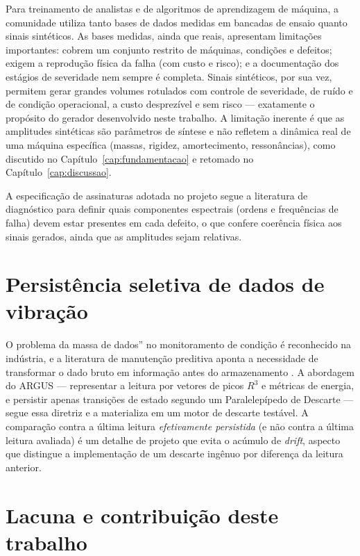 Para treinamento de analistas e de algoritmos de aprendizagem de máquina, a
comunidade utiliza tanto bases de dados medidas em bancadas de ensaio quanto
sinais sintéticos. As bases medidas, ainda que reais, apresentam limitações
importantes: cobrem um conjunto restrito de máquinas, condições e defeitos;
exigem a reprodução física da falha (com custo e risco); e a documentação dos
estágios de severidade nem sempre é completa. Sinais sintéticos, por sua vez,
permitem gerar grandes volumes rotulados com controle de severidade, de ruído e
de condição operacional, a custo desprezível e sem risco --- exatamente o
propósito do gerador desenvolvido neste trabalho. A limitação inerente é que as
amplitudes sintéticas são parâmetros de síntese e não refletem a dinâmica real
de uma máquina específica (massas, rigidez, amortecimento, ressonâncias), como
discutido no Capítulo~\ref{cap:fundamentacao} e retomado no
Capítulo~\ref{cap:discussao}.

A especificação de assinaturas adotada no projeto segue a literatura de
diagnóstico para definir quais componentes espectrais (ordens e frequências de
falha) devem estar presentes em cada defeito, o que confere coerência física aos
sinais gerados, ainda que as amplitudes sejam relativas.

\section{Persistência seletiva de dados de vibração}

O problema da \texttt{}massa de dados'' no monitoramento de condição é reconhecido na
indústria, e a literatura de manutenção preditiva aponta a necessidade de
transformar o dado bruto em informação antes do armazenamento
\cite{scheffer2004}. A abordagem do ARGUS --- representar a leitura por vetores
de picos \(R^3\) e métricas de energia, e persistir apenas transições de estado
segundo um Paralelepípedo de Descarte --- segue essa diretriz e a materializa
em um motor de descarte testável. A comparação contra a última leitura
\emph{efetivamente persistida} (e não contra a última leitura avaliada) é um
detalhe de projeto que evita o acúmulo de \emph{drift}, aspecto que distingue a
implementação de um descarte ingênuo por diferença da leitura anterior.

\section{Lacuna e contribuição deste trabalho}

